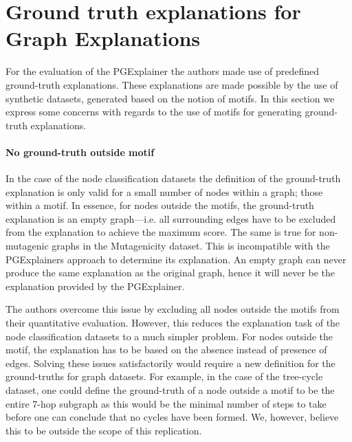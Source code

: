 \section{Ground truth explanations for Graph Explanations} \label{sec6}
For the evaluation of the PGExplainer the authors made use of predefined ground-truth explanations. These explanations are made possible by the use of synthetic datasets, generated based on the notion of motifs. In this section we express some concerns with regards to the use of motifs for generating ground-truth explanations. 

\paragraph{No ground-truth outside motif}
In the case of the node classification datasets the definition of the ground-truth explanation is only valid for a small number of nodes within a graph; those within a motif. In essence, for nodes outside the motifs, the ground-truth explanation is an empty graph---i.e. all surrounding edges have to be excluded from the explanation to achieve the maximum score. The same is true for non-mutagenic graphs in the Mutagenicity dataset. This is incompatible with the PGExplainers approach to determine its explanation. An empty graph can never produce the same explanation as the original graph, hence it will never be the explanation provided by the PGExplainer. 

The authors overcome this issue by excluding all nodes outside the motifs from their quantitative evaluation. However, this reduces the explanation task of the node classification datasets to a much simpler problem. For nodes outside the motif, the explanation has to be based on the absence instead of presence of edges. Solving these issues satisfactorily would require a new definition for the ground-truths for graph datasets. For example, in the case of the tree-cycle dataset, one could define the ground-truth of a node outside a motif to be the entire 7-hop subgraph as this would be the minimal number of steps to take before one can conclude that no cycles have been formed. We, however, believe this to be outside the scope of this replication.





